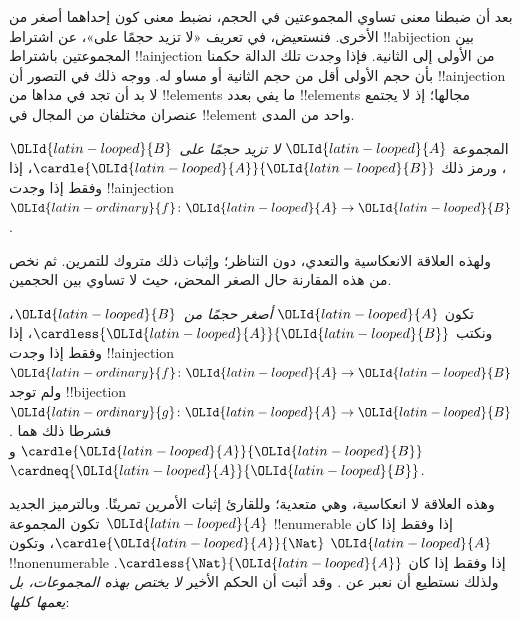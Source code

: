 \documentclass[../../../include/open-logic-section]{subfiles}
\begin{document}


\begin{explain}
بعد أن ضبطنا معنى تساوي المجموعتين في الحجم، نضبط معنى كون إحداهما أصغر من الأخرى. فنستعيض، في تعريف «لا تزيد حجمًا على»، عن اشتراط !!a{bijection} بين المجموعتين باشتراط !!a{injection} من الأولى إلى الثانية. فإذا وجدت تلك الدالة حكمنا بأن حجم الأولى أقل من حجم الثانية أو مساو له. ووجه ذلك في التصور أن !!a{injection} لا بد أن تجد في مداها من !!{element}s ما يفي بعدد !!{element}s مجالها؛ إذ لا يجتمع عنصران مختلفان من المجال في !!{element} واحد من المدى.
\end{explain}

\begin{defn}
المجموعة ${\OLId{latin-looped}{A}}$ \emph{لا تزيد حجمًا على}~${\OLId{latin-looped}{B}}$، ورمز ذلك $\cardle{{\OLId{latin-looped}{A}}}{{\OLId{latin-looped}{B}}}$، إذا وفقط إذا وجدت !!a{injection} ${\OLId{latin-ordinary}{f}} \colon {\OLId{latin-looped}{A}} \to {\OLId{latin-looped}{B}}$.
\end{defn}

ولهذه العلاقة الانعكاسية والتعدي، دون التناظر؛ وإثبات ذلك متروك للتمرين. ثم نخص من هذه المقارنة حال الصغر المحض، حيث لا تساوي بين الحجمين.

\begin{defn}
تكون ${\OLId{latin-looped}{A}}$ \emph{أصغر حجمًا من}~${\OLId{latin-looped}{B}}$، ونكتب $\cardless{{\OLId{latin-looped}{A}}}{{\OLId{latin-looped}{B}}}$، إذا وفقط إذا وجدت !!a{injection}~${\OLId{latin-ordinary}{f}}\colon {\OLId{latin-looped}{A}} \to {\OLId{latin-looped}{B}}$ ولم توجد !!{bijection}~${\OLId{latin-ordinary}{g}}\colon {\OLId{latin-looped}{A}}
\to {\OLId{latin-looped}{B}}$. فشرطا ذلك هما $\cardle{{\OLId{latin-looped}{A}}}{{\OLId{latin-looped}{B}}}$ و$\cardneq{{\OLId{latin-looped}{A}}}{{\OLId{latin-looped}{B}}}$.
\end{defn}

وهذه العلاقة لا انعكاسية، وهي متعدية؛ وللقارئ إثبات الأمرين تمرينًا. وبالترميز الجديد تكون المجموعة~${\OLId{latin-looped}{A}}$ !!{enumerable} إذا وفقط إذا كان $\cardle{{\OLId{latin-looped}{A}}}{\Nat}$، وتكون ${\OLId{latin-looped}{A}}$ !!{nonenumerable} إذا وفقط إذا كان $\cardless{\Nat}{{\OLId{latin-looped}{A}}}$. ولذلك نستطيع أن نعبر عن
. وقد أثبت \citet{Cantor1892} أن الحكم الأخير \emph{لا يختص بهذه المجموعات، بل يعمها كلها}:
\end{document}
